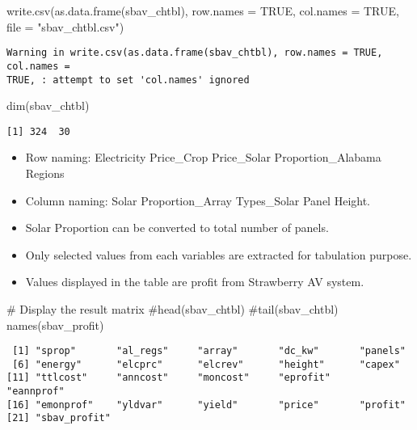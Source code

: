 \documentclass[
  letterpaper,
  DIV=11,
  numbers=noendperiod]{scrartcl}
\newenvironment{Shaded}{\begin{snugshade}}{\end{snugshade}}
\newcommand{\AttributeTok}[1]{\textcolor[rgb]{0.40,0.45,0.13}{#1}}
\newcommand{\CommentTok}[1]{\textcolor[rgb]{0.37,0.37,0.37}{#1}}
\newcommand{\ConstantTok}[1]{\textcolor[rgb]{0.56,0.35,0.01}{#1}}
\newcommand{\FunctionTok}[1]{\textcolor[rgb]{0.28,0.35,0.67}{#1}}
\newcommand{\NormalTok}[1]{\textcolor[rgb]{0.00,0.23,0.31}{#1}}
\newcommand{\StringTok}[1]{\textcolor[rgb]{0.13,0.47,0.30}{#1}}
\begin{document}
\begin{Shaded}
\begin{Highlighting}[]
\FunctionTok{write.csv}\NormalTok{(}\FunctionTok{as.data.frame}\NormalTok{(sbav\_chtbl),}
          \AttributeTok{row.names =} \ConstantTok{TRUE}\NormalTok{,}
          \AttributeTok{col.names =} \ConstantTok{TRUE}\NormalTok{,}
          \AttributeTok{file =} \StringTok{"sbav\_chtbl.csv"}\NormalTok{)}
\end{Highlighting}
\end{Shaded}

\begin{verbatim}
Warning in write.csv(as.data.frame(sbav_chtbl), row.names = TRUE, col.names =
TRUE, : attempt to set 'col.names' ignored
\end{verbatim}

\begin{Shaded}
\begin{Highlighting}[]
\FunctionTok{dim}\NormalTok{(sbav\_chtbl)}
\end{Highlighting}
\end{Shaded}

\begin{verbatim}
[1] 324  30
\end{verbatim}

\begin{itemize}
\item
  Row naming: Electricity Price\_Crop Price\_Solar Proportion\_Alabama
  Regions
\item
  Column naming: Solar Proportion\_Array Types\_Solar Panel Height.
\item
  Solar Proportion can be converted to total number of panels.
\item
  Only selected values from each variables are extracted for tabulation
  purpose.
\item
  Values displayed in the table are profit from Strawberry AV system.
\end{itemize}

\begin{Shaded}
\begin{Highlighting}[]
\CommentTok{\# Display the result matrix}
\CommentTok{\#head(sbav\_chtbl)}
\CommentTok{\#tail(sbav\_chtbl)}
\FunctionTok{names}\NormalTok{(sbav\_profit)}
\end{Highlighting}
\end{Shaded}

\begin{verbatim}
 [1] "sprop"       "al_regs"     "array"       "dc_kw"       "panels"     
 [6] "energy"      "elcprc"      "elcrev"      "height"      "capex"      
[11] "ttlcost"     "anncost"     "moncost"     "eprofit"     "eannprof"   
[16] "emonprof"    "yldvar"      "yield"       "price"       "profit"     
[21] "sbav_profit"
\end{verbatim}
\end{document}
